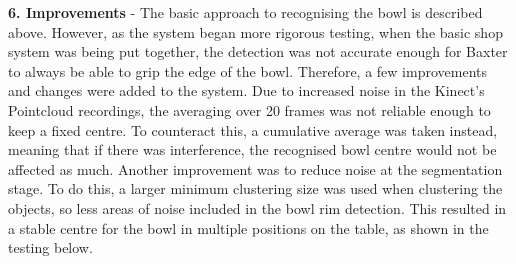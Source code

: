 \newline\newline
\textbf{6. Improvements} - 
The basic approach to recognising the bowl is described above. However, as the system began more rigorous testing, when the basic shop system was being put together, the detection was not accurate enough for Baxter to always be able to grip the edge of the bowl. Therefore, a few improvements and changes were added to the system.
\newline\newline
Due to increased noise in the Kinect's Pointcloud recordings, the averaging over 20 frames was not reliable enough to keep a fixed centre. To counteract this, a cumulative average was taken instead, meaning that if there was interference, the recognised bowl centre would not be affected as much. Another improvement was to reduce noise at the segmentation stage. To do this, a larger minimum clustering size was used when clustering the objects, so less areas of noise included in the bowl rim detection. This resulted in a stable centre for the bowl in multiple positions on the table, as shown in the testing below.

